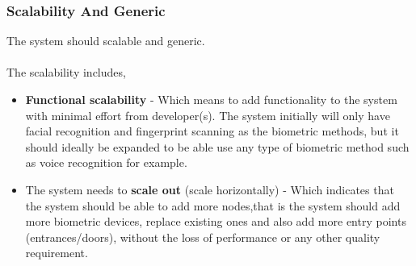 \subsubsection{Scalability And Generic}
The system should scalable and generic.\\
\\The scalability includes,
\begin{itemize}
	\item  \textbf{Functional scalability} - Which means to add functionality to the system with minimal effort from developer(s).
		The system initially will only have facial recognition and fingerprint scanning as the biometric methods, but it should ideally be expanded to be able use any type of biometric method such as voice recognition for example.
	\item  The system needs to \textbf{scale out} (scale horizontally) - Which indicates that the system should be able to add more nodes,that 		is the system should add more biometric devices, replace existing ones and also add more entry points (entrances/doors), 			without the loss of performance or any other quality requirement.
\end{itemize}





